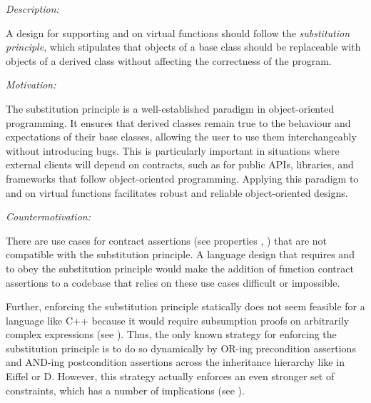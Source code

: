 
\emph{Description:}

A design for supporting  and  on virtual functions should follow the \emph{substitution principle}, which stipulates that objects of a base class should be replaceable with objects of a derived class without affecting the correctness of the program. 


\emph{Motivation:}

The substitution principle is a well-established paradigm in object-oriented programming. It ensures that derived classes remain true to the behaviour and expectations of their base classes, allowing the user to use them interchangeably without introducing bugs. This is particularly important in situations where external clients will depend on contracts, such as for public APIs, libraries, and frameworks that follow object-oriented programming. Applying this paradigm to  and  on virtual functions facilitates robust and reliable object-oriented designs.

\emph{Countermotivation:}

There are use cases for contract assertions (see properties , ) that are not compatible with the substitution principle. A language design that requires  and  to obey the substitution principle would make the addition of function contract assertions to a codebase that relies on these use cases difficult or impossible.

Further, enforcing the substitution principle statically does not seem feasible for a language like C++ because it would require subsumption proofs on arbitrarily complex expressions (see \cite{P3165R0}). Thus, the only known  strategy for enforcing the substitution principle is to do so dynamically by OR-ing precondition assertions and AND-ing postcondition assertions across the inheritance hierarchy like in Eiffel or D. However, this strategy actually enforces an even stronger set of constraints, which has a number of implications (see ).

